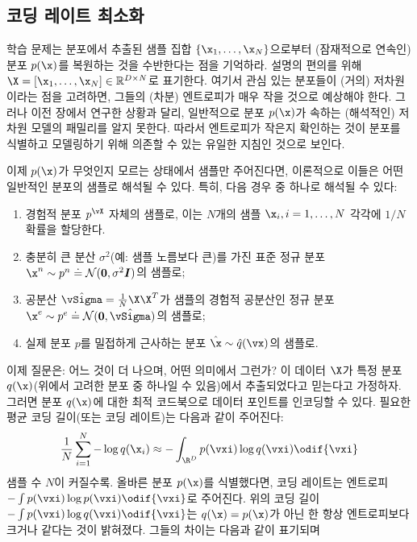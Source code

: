 \documentclass[../../book-main_ko.tex]{subfiles}
\begin{document}
\subsection{코딩 레이트 최소화}\label{sub:min_entropy}
학습 문제는 분포에서 추출된 샘플 집합 $\{\x_1, \ldots, \x_N\}$으로부터 (잠재적으로 연속인) 분포 $p(\x)$를 복원하는 것을 수반한다는 점을 기억하라. 설명의 편의를 위해 $\X = [\x_1, \ldots, \x_N] \in \mathbb{R}^{D\times N}$로 표기한다. 여기서 관심 있는 분포들이 (거의) 저차원이라는 점을 고려하면, 그들의 (차분) 엔트로피가 매우 작을 것으로 예상해야 한다. 그러나 이전 장에서 연구한 상황과 달리, 일반적으로 분포 $p(\x)$가 속하는 (해석적인) 저차원 모델의 패밀리를 알지 못한다. 따라서 엔트로피가 작은지 확인하는 것이 분포를 식별하고 모델링하기 위해 의존할 수 있는 유일한 지침인 것으로 보인다.

이제 $p(\x)$가 무엇인지 모르는 상태에서 샘플만 주어진다면, 이론적으로 이들은 어떤 일반적인 분포의 샘플로 해석될 수 있다. 특히, 다음 경우 중 하나로 해석될 수 있다:
\begin{enumerate}
	\item 경험적 분포 $p^{\vX}$ 자체의 샘플로, 이는 $N$개의 샘플 $\x_i, i=1, \ldots, N$ 각각에 $1/N$ 확률을 할당한다.
	\item 충분히 큰 분산 $\sigma^2$(예: 샘플 노름보다 큰)를 가진 표준 정규 분포 $\x^n \sim p^{n} \doteq \mathcal{N}(\boldsymbol{0}, \sigma^2 \boldsymbol{I})$의 샘플로;
	\item 공분산 $\hat{\vSigma} = \frac{1}{N} \X \X^T$가 샘플의 경험적 공분산인 정규 분포 $\x^e \sim p^{e} \doteq \mathcal{N}(\boldsymbol{0}, \hat{\vSigma})$의 샘플로;
	\item 실제 분포 $p$를 밀접하게 근사하는 분포 $\hat \x \sim \hat{q}(\vx)$의 샘플로.
\end{enumerate}
이제 질문은: 어느 것이 더 나으며, 어떤 의미에서 그런가? 이 데이터 $\X$가 특정 분포 $q(\x)$(위에서 고려한 분포 중 하나일 수 있음)에서 추출되었다고 믿는다고 가정하자. 그러면 분포 $q(\x)$에 대한 최적 코드북으로 데이터 포인트를 인코딩할 수 있다. 필요한 평균 코딩 길이(또는 코딩 레이트)는 다음과 같이 주어진다:
\begin{equation}
	\frac{1}{N}\sum_{i=1}^N -\log q(\x_i)      \approx      - \int_{\R^{D}} p(\vxi) \log q(\vxi)\odif{\vxi}
\end{equation}
샘플 수 $N$이 커질수록. 올바른 분포 $p(\x)$를 식별했다면, 코딩 레이트는 엔트로피 $- \int p(\vxi) \log p(\vxi) \odif{\vxi}$로 주어진다. 위의 코딩 길이 $- \int p(\vxi) \log q(\vxi) \odif{\vxi}$는 $q(\x) = p(\x)$가 아닌 한 항상 엔트로피보다 크거나 같다는 것이 밝혀졌다. 그들의 차이는 다음과 같이 표기되며
\end{document}
